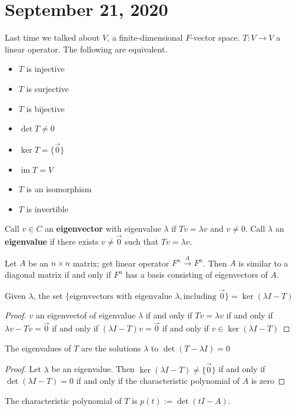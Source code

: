 \documentclass{article}
\newcommand{\vocab}[1]{\textbf{\color{blue!90}\boldmath #1}}
\newcommand{\ra}[1][]{\xrightarrow{#1}}
\DeclareMathOperator{\im}{im}
\begin{document}
\section{September 21, 2020}
Last time we talked about $V$, a finite-dimensional $F$-vector space. $T:V\ra V$ a linear operator. The following are equivalent. 
\begin{itemize}
    \item $T$ is injective
    \item $T$ is surjective
    \item $T$ is bijective
    \item $\det T\neq 0$
    \item $\ker T=\{\vec{0}\}$
    \item $\im T=V$
    \item $T$ is an isomorphism
    \item $T$ is invertible
\end{itemize}
\begin{definition}
Call $v\in C$ an \vocab{eigenvector} with eigenvalue $\lambda$ if $Tv=\lambda v$ and $v\neq0$. Call $\lambda$ an \vocab{eigenvalue} if there exists $v\neq \vec{0}$ such that $Tv=\lambda v$.
\end{definition}
\begin{proposition}
Let $A$ be an $n\times n$ matrix; get linear operator $F^n\ra[A]F^n$. Then $A$ is similar to a diagonal matrix if and only if $F^n$ has a basis consisting of eigenvectors of $A$. 
\end{proposition}
\begin{definition}
Given $\lambda$, the set $\{\textrm{eigenvectors with eigenvalue } \lambda, \textrm{including }\vec{0}\}=\ker(\lambda I-T)$
\end{definition}
\begin{proof}
$v$ an eigenvectof of eigenvalue $\lambda$ if and only if $Tv=\lambda v$ if and only if $\lambda v-Tv=\vec{0}$ if and only if $(\lambda I-T)v=\vec{0}$ if and only if $v\in\ker(\lambda I-T)$
\end{proof}
\begin{proposition}
The eigenvalues of $T$ are the solutions $\lambda$ to $\det(T-\lambda I)=0$
\end{proposition}
\begin{proof}
Let $\lambda$ be an eigenvalue. Then $\ker(\lambda I-T)\neq \{\vec{0}\}$ if and only if $\det(\lambda I-T)=0$ if and only if the characteristic polynomial of $A$ is zero 
\end{proof}
\begin{definition}
The characteristic polynomial of $T$ is $p(t):=\det(t I-A)$. 
\end{definition}
\end{document}
